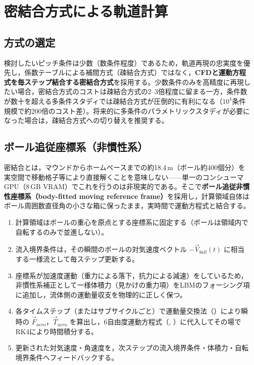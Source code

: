 \section{密結合方式による軌道計算}
\label{sec:coupling}

\subsection{方式の選定}

検討したいピッチ条件は少数（数条件程度）であるため，軌道再現の忠実度を優先し，係数テーブルによる補間方式（疎結合方式）ではなく，\textbf{CFDと運動方程式を毎ステップ結合する密結合方式}を採用する。少数条件のみを高精度に再現したい場合，密結合方式のコストは疎結合方式の2--3倍程度に留まる一方，条件数が数十を超える多条件スタディでは疎結合方式が圧倒的に有利になる（\(10^4\)条件規模で約200倍のコスト差）。将来的に多条件のパラメトリックスタディが必要になった場合は，疎結合方式への切り替えを推奨する。

\subsection{ボール追従座標系（非慣性系）}
\label{sec:frame}

密結合とは，マウンドからホームベースまでの約18.4\,m（ボール約400個分）を実空間で移動格子等により直接解くことを意味しない——単一のコンシューマGPU（8\,GB VRAM）でこれを行うのは非現実的である。そこで\textbf{ボール追従非慣性座標系（body-fitted moving reference frame）}を採用し，計算領域自体はボール周囲数直径角の小さな箱に保ったまま，実時間で運動方程式と結合する。

\begin{enumerate}
	\item 計算領域はボールの重心を原点とする座標系に固定する（ボールは領域内で自転するのみで並進しない）。
	\item 流入境界条件は，その瞬間のボールの対気速度ベクトル \(-\vec V_{ball}(t)\) に相当する一様流として毎ステップ更新する。
	\item 座標系が加速度運動（重力による落下，抗力による減速）をしているため，非慣性系補正として一様体積力（見かけの重力項）をLBMのフォーシング項に追加し，流体側の運動量収支を物理的に正しく保つ。
	\item 各タイムステップ（またはサブサイクルごと）で運動量交換法（）により瞬時の \(\vec F_{aero}\)，\(\vec T_{aero}\) を算出し，6自由度運動方程式（, ）に代入してその場でRK4により時間積分する。
	\item 更新された対気速度・角速度を，次ステップの流入境界条件・体積力・自転境界条件へフィードバックする。
\end{enumerate}

